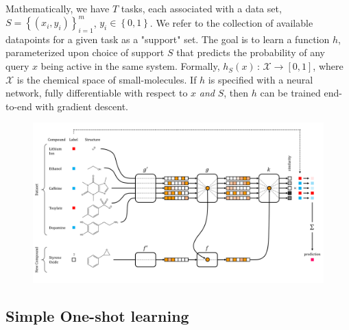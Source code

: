 \documentclass[journal=jacsat,manuscript=article]{achemso}
\begin{document}

Mathematically, we have $T$ tasks, each associated with a data set, $S=\left\{\left(x_i,y_i\right)\right\}_{i=1}^{m}$, $y_i\in\left\{0,1\right\}$. We refer to the collection of available datapoints for a given task as a "support" set. The goal is to learn a function $h$, parameterized upon choice of support $S$ that predicts the probability of any query $x$ being active in the same system. Formally, $h_S(x)\,:\,\mathcal{X}\rightarrow\left[0,1\right]$, where $\mathcal{X}$ is the chemical space of small-molecules. If $h$ is specified with a neural network, fully differentiable with respect to $x$ \emph{and} $S$, then $h$ can be trained end-to-end with gradient descent.


\begin{figure}
\includegraphics[width=\textwidth]{schematic.png}
\end{figure}

\subsection{Simple One-shot learning}
\end{document}
